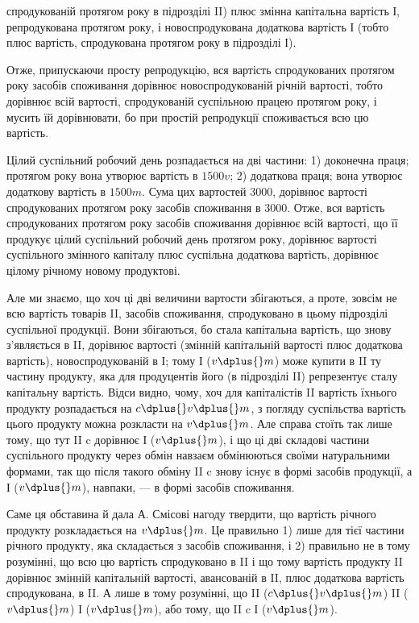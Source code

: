 \parcont{}  %
спродукованій протягом року в підрозділі II) плюс змінна капітальна
вартість І, репродукована протягом року, і новоспродукована додаткова
вартість І (тобто плюс вартість, спродукована протягом року в підрозділі
І).

Отже, припускаючи просту репродукцію, вся вартість спродукованих
протягом року засобів споживання дорівнює новоспродукованій річній
вартості, тобто дорівнює всій вартості, спродукованій суспільною працею
протягом року, і мусить їй дорівнювати, бо при простій репродукції
споживається всю цю вартість.

Цілий суспільний робочий день розпадається на дві частини: 1) доконечна
праця; протягом року вона утворює вартість в $1500 v$; 2) додаткова
праця; вона утворює додаткову вартість в $1500 m$. Сума цих
вартостей \deq{} 3000, дорівнює вартості спродукованих протягом року засобів
споживання в 3000. Отже, вся вартість спродукованих протягом
року засобів споживання дорівнює всій вартості, що її продукує цілий
суспільний робочий день протягом року, дорівнює вартості суспільного змінного
капіталу плюс суспільна додаткова вартість, дорівнює цілому річному
новому продуктові.

Але ми знаємо, що хоч ці дві величини вартости збігаються, а проте,
зовсім не всю вартість товарів II, засобів споживання, спродуковано
в цьому підрозділі суспільної продукції. Вони збігаються, бо стала
капітальна вартість, що знову з’являється в II, дорівнює вартості (змінній
капітальній вартості плюс додаткова вартість), новоспродукованій
в І; тому І ($v \dplus{} m$) може купити в II ту частину продукту, яка для продуцентів
його (в підрозділі II) репрезентує сталу капітальну вартість. Відси
видно, чому, хоч для капіталістів II вартість їхнього продукту розпадається
на $c \dplus{} v \dplus{} m$, з погляду суспільства вартість цього продукту
можна розкласти на $v \dplus{} m$. Але справа стоїть так лише тому, що тут
II c дорівнює І ($v \dplus{} m$), і що ці дві складові частини суспільного продукту
через обмін навзаєм обмінюються своїми натуральними формами,
так що після такого обміну II c знову існує в формі засобів продукції,
а І ($v \dplus{} m$), навпаки, — в формі засобів споживання.

Саме ця обставина й дала А. Смісові нагоду твердити, що вартість
річного продукту розкладається на $v \dplus{} m$. Це правильно 1) лише для
тієї частини річного продукту, яка складається з засобів споживання, і
2) правильно не в тому розумінні, що всю цю вартість спродуковано в II і
що тому вартість продукту II дорівнює змінній капітальній вартості, авансованій
в II, плюс додаткова вартість спродукована, в II. А лише в тому
розумінні, що II ($c \dplus{} v \dplus{} m$) \deq{} II ($v \dplus{} m$) \dplus{} І ($v \dplus{} m$), або тому, що
II c \deq{} І ($v \dplus{} m$).

